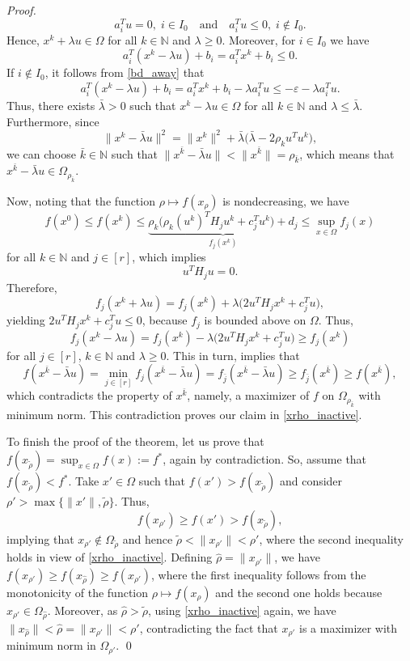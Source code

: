 \documentclass[smallextended,referee,envcountsect]{svjour3}
\newcommand{\N}{\mathbb{N}}
\begin{document}
\begin{proof}
\begin{equation}
\label{u_rec}
a_i^Tu=0,\; i\in I_0 \quad\mbox{and}\quad a_i^Tu\leq 0,\; i\notin I_0.
\end{equation}
Hence, $x^k+\lambda u\in\Omega$ for all $k\in\N$ and $\lambda\geq 0$. Moreover, 
for $i\in I_0$ we have 
$$
a_i^T(x^k-\lambda u)+b_i=a_i^Tx^k+b_i\leq 0.
$$
If $i\notin I_0$, it follows from \eqref{bd_away} that 
$$
a_i^T(x^k-\lambda u)+b_i=a_i^Tx^k+b_i-\lambda a_i^Tu\leq-\varepsilon-\lambda a_i^Tu. 
$$
Thus, there exists $\bar\lambda>0$ such that $x^k-\lambda u\in\Omega$ for all $k\in\N$ 
and $\lambda\leq\bar\lambda$. Furthermore, since 
$$
\|x^k-\bar\lambda u\|^2=\|x^k\|^2+\bar\lambda\big(\bar\lambda-2\rho_ku^Tu^k\big),
$$
we can choose $\bar{k}\in\mathbb{N}$ such that 
$\|x^{\bar{k}}-\bar\lambda u\|<\|x^{\bar{k}}\|=\rho_{\bar{k}}$, which 
means that $x^{\bar{k}}-\bar\lambda u\in\Omega_{\rho_{\bar{k}}}$. 

Now, noting that the function $\rho\mapsto f(x_\rho)$ is nondecreasing, we have 
$$
f(x^0)\leq f(x^k)\leq
\underbrace{\rho_k\big(\rho_k(u^k)^TH_ju^k+c_j^Tu^k\big)+d_j}_{f_j(x^k)}
\leq\sup_{x\in\Omega}f_j(x)
$$
for all $k\in\N$ and $j\in[r]$, which implies 
\begin{equation}
\label{uHu0}
u^TH_ju=0.
\end{equation}
Therefore, 
$$
f_j(x^k+\lambda u)=f_j(x^k)+\lambda\big(2u^TH_jx^k+c_j^Tu\big),
$$
yielding $2u^TH_jx^k+c_j^Tu\leq 0$, because $f_j$ is bounded above on $\Omega$. 
Thus, 
$$
f_j(x^k-\lambda u)=f_j(x^k)-\lambda\big(2u^TH_jx^k+c_j^Tu\big)\geq f_j(x^k)
$$
for all $j\in[r]$, $k\in\N$ and $\lambda\geq 0$. This in turn, implies that 
$$
f(x^{\bar{k}}-\bar\lambda u)=\min_{j\in[r]}f_j(x^{\bar{k}}-\bar\lambda u)
=f_{\bar{j}}(x^{\bar{k}}-\bar\lambda u)\geq f_{\bar{j}}(x^{\bar{k}})\geq f(x^{\bar{k}}),
$$
which contradicts the property of $x^{\bar{k}}$, namely, a maximizer of $f$ on 
$\Omega_{\rho_{\bar{k}}}$ with minimum norm. This contradiction proves our claim 
in \eqref{xrho_inactive}. 

To finish the proof of the theorem, let us prove that 
$f(x_{\tilde\rho})=\displaystyle\sup_{x\in\Omega}f(x):=f^*$, again by contradiction. 
So, assume that $f(x_{\tilde\rho})<f^*$. Take $x'\in\Omega$ such that 
$f(x') > f(x_{\tilde\rho})$ and consider $\rho'>\max\{\|x'\|,\tilde\rho\}$. Thus, 
$$
f(x_{\rho'})\geq f(x') > f(x_{\tilde\rho}),
$$ 
implying that $x_{\rho'}\notin\Omega_{\tilde\rho}$ and hence 
$\tilde\rho<\|x_{\rho'}\|<\rho'$, where the second inequality holds in view 
of \eqref{xrho_inactive}. Defining $\hat\rho=\|x_{\rho'}\|$, we have 
$f(x_{\rho'})\geq f(x_{\hat\rho})\geq f(x_{\rho'})$, where the first inequality follows 
from the monotonicity of the function $\rho\mapsto f(x_\rho)$ and the second one holds 
because $x_{\rho'}\in\Omega_{\hat\rho}$. Moreover, as $\hat\rho>\tilde\rho$, 
using \eqref{xrho_inactive} again, we have $\|x_{\hat\rho}\|<\hat\rho=\|x_{\rho'}\|<\rho'$, 
contradicting the fact that $x_{\rho'}$ is a maximizer with minimum norm in 
$\Omega_{\rho'}$.
\qed\end{proof}
\end{document}
